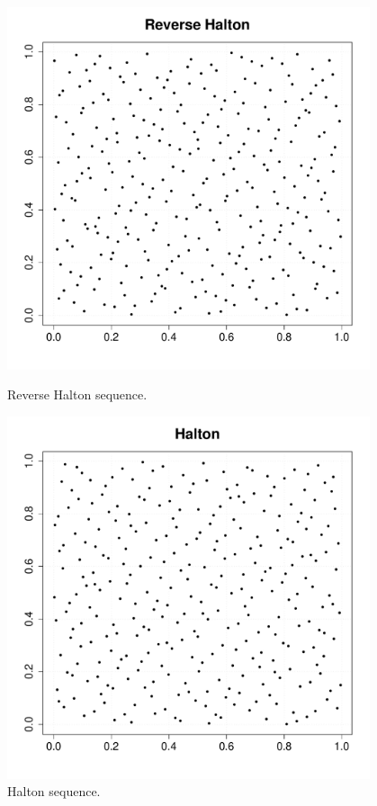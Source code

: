 {        \begin{figure}[H]
          \begin{minipage}{0.5\textwidth}
            \begin{center}
              \includegraphics[width=0.95\textwidth]{Figures/reverseHalton_cloud.pdf}
              \caption{Reverse Halton sequence.}
              \label{ReverseHalton}
            \end{center}
          \end{minipage}
          \hfill
          \begin{minipage}{0.5\textwidth}
            \begin{center}
              \includegraphics[width=0.95\textwidth]{Figures/halton_cloud.pdf}
              \caption{Halton sequence.}
              \label{Halton}
            \end{center}
          \end{minipage}
        \end{figure}

}
